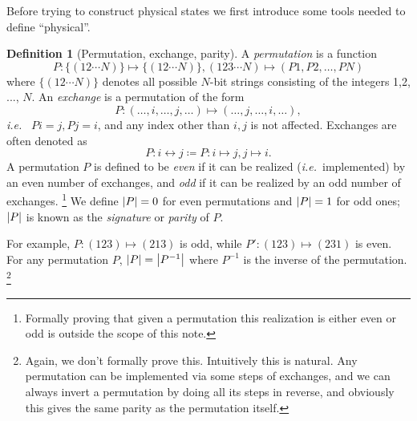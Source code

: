 \documentclass{article}
\theoremstyle{definition}
\newtheorem{dfn}[mot]{Definition}
\numberwithin{equation}{section}
\begin{document}
Before trying to construct physical states we first introduce 
some tools needed to define ``physical''.

\begin{dfn}[Permutation, exchange, parity]
    A \emph{permutation} is a 
    function 
    \begin{equation}
        P: \{(12\cdots N)\} \mapsto \{(12\cdots N)\}, 
    (123\cdots N) \mapsto (P1, P2, \ldots ,PN)
    \end{equation}
    where $\{(12\cdots N)\}$ denotes all possible $N$-bit strings 
    consisting of the integers 1,2, ..., $N$. 
    An \emph{exchange} is a permutation of the form 
    \begin{equation}
        P: (\ldots ,i, \ldots ,j, \ldots )
        \mapsto 
        (\ldots ,j, \ldots ,i, \ldots ),
    \end{equation}
    \textit{i.e.}~ $Pi=j, Pj=i$, and 
    any index other than $i,j$ is not affected.
    Exchanges are often denoted as
     \[P: i \leftrightarrow j \coloneqq P: i \mapsto j, j \mapsto i. \]
    A permutation $P$ is defined to be \emph{even} if 
    it can be realized (\textit{i.e.}~implemented) by an even number of 
    exchanges, and \emph{odd} if it can be realized by 
    an odd number of exchanges. 
    \footnote{Formally proving that given a permutation 
    this realization is either even or odd 
    is outside the scope of this note.}
    We define $\abs{P} = 0$ for even permutations 
    and $\abs{P} = 1$ for odd ones; $\abs{P}$ is known as 
    the \textit{signature} or \textit{parity} of $P$. 
\end{dfn}

    For example, 
    $P: (123) \mapsto (213)$ is odd, 
    while $P': (123) \mapsto (231)$ is even.
    For any permutation $P$, $\abs{P} = \abs{P ^{-1}}$ 
    where $P ^{-1}$ is the inverse of the permutation.
    \footnote{Again, we don't formally prove this. Intuitively 
    this is natural. Any permutation can be implemented 
    via some steps of exchanges, and we can always invert a permutation by 
    doing all its steps in reverse, and obviously this gives the 
    same parity as the permutation itself.}
\end{document}
